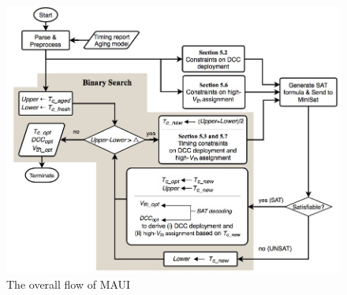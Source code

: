 \begin{figure}
	\includegraphics[width=0.85\columnwidth]{Flow_chart.png} %
	\caption{The overall flow of MAUI}
	\label{fig:flow}
\end{figure}